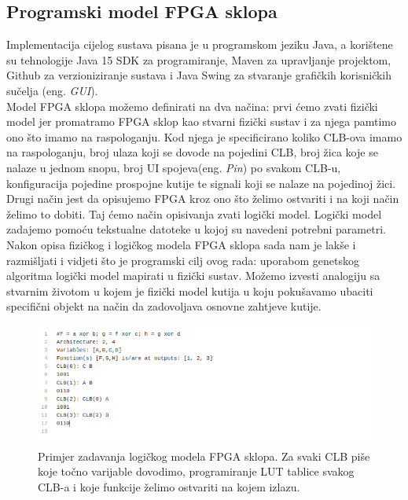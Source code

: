 \documentclass[times, utf8, zavrsni]{fer}
\begin{document}
\subsection{Programski model FPGA sklopa}

Implementacija cijelog sustava pisana je u programskom jeziku Java, a korištene su tehnologije Java 15 SDK za programiranje, Maven za upravljanje projektom, Github za verzioniziranje sustava i Java Swing za stvaranje grafičkih korisničkih sučelja (eng. \emph{GUI}).\\ Model FPGA sklopa možemo definirati na dva načina: prvi ćemo zvati fizički model jer promatramo FPGA sklop kao stvarni fizički sustav i za njega pamtimo ono što imamo na raspologanju. Kod njega je specificirano koliko CLB-ova imamo na raspologanju, broj ulaza koji se dovode na pojedini CLB, broj žica koje se nalaze u jednom snopu, broj UI spojeva(eng. \emph{Pin}) po svakom CLB-u, konfiguracija pojedine prospojne kutije te signali koji se nalaze na pojedinoj žici.\\Drugi način jest da opisujemo FPGA kroz ono što želimo ostvariti i na koji način želimo to dobiti. Taj ćemo način opisivanja zvati logički model. Logički model zadajemo pomoću tekstualne datoteke u kojoj su navedeni potrebni parametri.\\Nakon opisa fizičkog i logičkog modela FPGA sklopa sada nam je lakše i razmišljati i vidjeti što je programski cilj ovog rada: uporabom genetskog algoritma logički model mapirati u fizički sustav. Možemo izvesti analogiju sa stvarnim životom u kojem je fizički model kutija u koju pokušavamo ubaciti specifični objekt na način da zadovoljava osnovne zahtjeve kutije.


\begin{figure}[!htb]
	\centering
	\includegraphics[width=15cm]{slike/logicalModelTxt.png}
	\caption{Primjer zadavanja logičkog modela FPGA sklopa. Za svaki CLB piše koje točno varijable dovodimo, programiranje LUT tablice svakog CLB-a i koje funkcije želimo ostvariti na kojem izlazu. }
	\label{fig:fpga-logical-model}
\end{figure}
\end{document}
